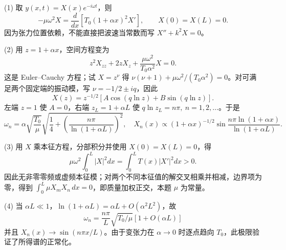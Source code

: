 (1) 取 \(y(x,t)=X(x)e^{-i\omega t}\)，则
\[
-\mu\omega^2X=\frac d{dx}\left[T_0(1+\alpha x)^2X'\right],\qquad X(0)=X(L)=0.
\]
因为张力位置依赖，不能直接把波速当常数而写 \(X''+k^2X=0\)。

(2) 用 \(z=1+\alpha x\)，空间方程变为
\[
z^2X_{zz}+2zX_z+\frac{\mu\omega^2}{T_0\alpha^2}X=0.
\]
这是 Euler–Cauchy 方程；试 \(X=z^\nu\) 得 \(\nu(\nu+1)+\mu\omega^2/(T_0\alpha^2)=0\)。对可满足两个固定端的振动模，写 \(\nu=-1/2\pm iq\)，因此
\[
X(z)=z^{-1/2}[A\cos(q\ln z)+B\sin(q\ln z)].
\]
左端 \(z=1\) 使 \(A=0\)，右端 \(z_L=1+\alpha L\) 使 \(q\ln z_L=n\pi,\ n=1,2,\ldots\)。于是
\[
\omega_n=\alpha\sqrt{\frac{T_0}{\mu}}
\sqrt{\frac14+\left(\frac{n\pi}{\ln(1+\alpha L)}\right)^2},
\quad X_n(x)\propto(1+\alpha x)^{-1/2}
\sin\frac{n\pi\ln(1+\alpha x)}{\ln(1+\alpha L)}.
\]

(3) 用 \(X\) 乘本征方程，分部积分并使用 \(X(0)=X(L)=0\)，得
\[
\mu\omega^2\int_0^L|X|^2dx=\int_0^L T(x)|X'|^2dx>0.
\]
因此无非零零频或虚频本征模；对两个不同本征值的解交叉相乘并相减，边界项为零，得到 \(\int_0^L\mu X_mX_n\,dx=0\)，即质量加权正交，本题 \(\mu\) 为常量。

(4) 当 \(\alpha L\ll1\)，\(\ln(1+\alpha L)=\alpha L+O(\alpha^2L^2)\)，故
\[
\omega_n=\frac{n\pi}{L}\sqrt{T_0/\mu}[1+O(\alpha L)]
\]
并且 \(X_n(x)\to\sin(n\pi x/L)\)。由于变张力在 \(\alpha\to0\) 时逐点趋向 \(T_0\)，此极限验证了所得谱的正常化。
